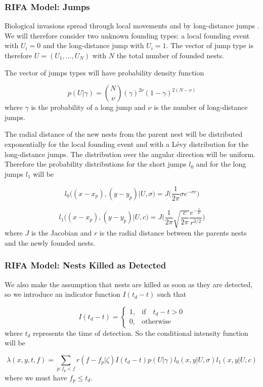 \documentclass[9pt, xcolor={dvipsnames,svgnames,table}]{beamer}
\begin{document}
\begin{frame}
\frametitle{RIFA Model: Jumps}
    Biological invasions spread through local movements and by long-distance jumps \cite{Suarez}. We will therefore consider two unknown founding types: a local founding event with $U_i = 0$ and the long-distance jump with $U_i = 1$. The vector of jump type is therefore $U = (U_1, \dots, U_N)$ with $N$ the total number of founded nests.

    The vector of jumps types will have probability density function

    \begin{equation*}
        p(U| \gamma ) = {N \choose \nu}(\gamma)^{2\nu}(1 - \gamma)^{2(N - \nu)}
    \end{equation*}
    where $\gamma$ is the probability of a long jump and $\nu$ is the number of long-distance jumps.

    The  radial distance of the new nests from the parent nest will be distributed exponentially for the local founding event and with a L\'evy distribution for the long-distance jumps. The distribution over the angular direction will be uniform.
    Therefore the probability distributions for the short jumps $l_0$ and for the long jumps $l_1$ will be

    \begin{equation*}
        l_0\Big((x - x_p), (y - y_p) | U, \sigma \Big)= J \bigg(\frac{1}{2 \pi} \sigma e^{- \sigma r}\bigg)
    \end{equation*}

    \begin{equation*}
        l_1\Big((x - x_p), (y - y_p) | U, c \Big)= J \bigg(\frac{1}{2 \pi} \sqrt{\frac{c}{2 \pi}} \frac{e^{- \frac{c}{ 2 r}}}{r^{3/2}}\bigg)
    \end{equation*}
    where $J$ is the Jacobian and $r$ is the radial distance between the parents nests and the newly founded nests.
\end{frame}

\begin{frame}
\frametitle{RIFA Model: Nests Killed as Detected}
    We also make the assumption that nests are killed as soon as they are detected, so we introduce an indicator function $I(t_d - t)$ such that

    \begin{equation*}
        I (t_d - t) =
        \begin{cases}
            1, & \mbox{if} \quad t_d -  t> 0 \\
            0, & \mbox{otherwise}
        \end{cases}
    \end{equation*}
    where $t_d$ represents the time of detection. So the conditional intensity function will be

    \begin{equation*}
        \lambda(x, y, t, f) = \sum_{p:f_p < f} r(f - f_p | \zeta) I(t_d - t) p(U | \gamma) l_0(x, y | U, \sigma) l_1(x, y | U, c)
    \end{equation*}
    where we must have $f_p\leq t_d$.
\end{frame}
\end{document}
